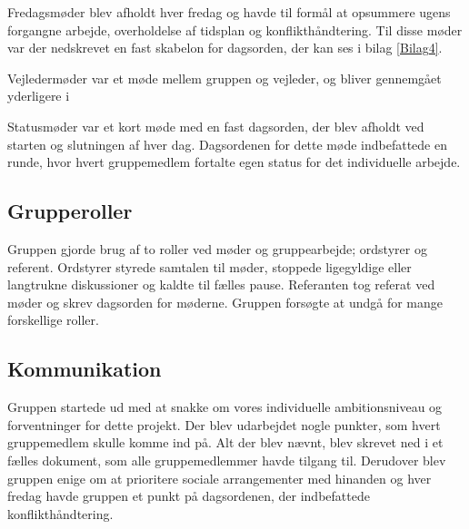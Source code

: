 Fredagsmøder blev afholdt hver fredag og havde til formål at opsummere ugens forgangne arbejde, overholdelse af tidsplan og konflikthåndtering. Til disse møder var der nedskrevet en fast skabelon for dagsorden, der kan ses i bilag \ref{Bilag4}.

Vejledermøder var et møde mellem gruppen og vejleder, og bliver gennemgået yderligere i 

Statusmøder var et kort møde med en fast dagsorden, der blev afholdt ved starten og slutningen af hver dag. Dagsordenen for dette møde indbefattede en runde, hvor hvert gruppemedlem fortalte egen status for det individuelle arbejde.

\subsection{Grupperoller}
Gruppen gjorde brug af to roller ved møder og gruppearbejde; ordstyrer og referent. Ordstyrer styrede samtalen til møder, stoppede ligegyldige
eller langtrukne diskussioner og kaldte til fælles pause. Referanten tog referat ved møder og skrev dagsorden for møderne. Gruppen forsøgte at undgå for mange forskellige roller.

\subsection{Kommunikation}
Gruppen startede ud med at snakke om vores individuelle ambitionsniveau og forventninger for dette projekt. Der blev udarbejdet nogle punkter, som hvert gruppemedlem skulle komme ind på. Alt der blev nævnt, blev skrevet ned i et fælles dokument, som alle gruppemedlemmer havde tilgang til. Derudover blev gruppen enige om at prioritere sociale arrangementer med hinanden og hver fredag havde gruppen et punkt på dagsordenen, der indbefattede konflikthåndtering. 
